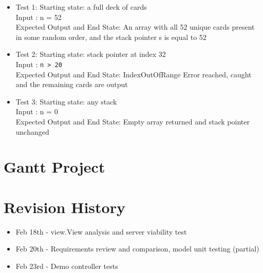 \documentclass{article}
\begin{document}
\begin{itemize}
    \item Test 1: Starting state: a full deck of cards\\
    Input : n = 52\\
    Expected Output and End State: An array with all 52 unique cards present in some random order, and the stack pointer s is equal to 52
    \item Test 2: Starting state: stack pointer at index 32\\
    Input : \verb|n > 20|\\
    Expected Output and End State: IndexOutOfRange Error reached, caught and the remaining cards are output
    \item Test 3: Starting state: any stack\\
    Input : n = 0\\
    Expected Output and End State: Empty array returned and stack pointer unchanged
\end{itemize}

\section{Gantt Project}



\section{Revision History}

\begin{itemize}
    \item Feb 18th - view.View analysis and server viability test
    \item Feb 20th - Requirements review and comparison, model unit testing (partial)
    \item Feb 23rd - Demo controller tests
\end{itemize}
\end{document}
